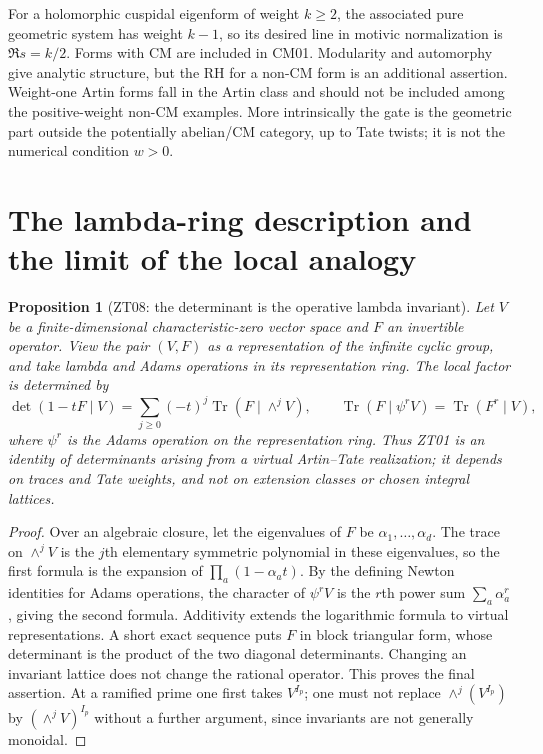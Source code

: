 \documentclass[11pt,a4paper]{article}
\newtheorem{proposition}[theorem]{Proposition}
\theoremstyle{definition}
\begin{document}
For a holomorphic cuspidal eigenform of weight $k\geq2$, the
associated pure geometric system has weight $k-1$, so its desired
line in motivic normalization is $\Re s=k/2$.  Forms with CM are
included in CM01.  Modularity and automorphy give analytic structure,
but the RH for a non-CM form is an additional assertion.  Weight-one
Artin forms fall in the Artin class and should not be included among
the positive-weight non-CM examples.  More intrinsically the gate
is the geometric part outside the potentially abelian/CM category,
up to Tate twists; it is not the numerical condition $w>0$.

\section{The lambda-ring description and the limit of the local analogy}
\label{sec:lambda}

\begin{proposition}[ZT08: the determinant is the operative lambda invariant]
\label{ZT08}
Let $V$ be a finite-dimensional characteristic-zero vector space and
$F$ an invertible operator.  View the pair $(V,F)$ as a representation
of the infinite cyclic group, and take lambda and Adams operations
in its representation ring.  The local factor is determined by
\[
 \det(1-tF\mid V)=\sum_{j\geq0}(-t)^j
                 \operatorname{Tr}(F\mid\wedge^jV),
 \qquad
 \operatorname{Tr}(F\mid\psi^r V)=\operatorname{Tr}(F^r\mid V),
\]
where $\psi^r$ is the Adams operation on the representation ring.
Thus ZT01 is an identity of determinants arising from a virtual
Artin--Tate realization; it depends on traces and Tate weights,
and not on extension classes or chosen integral lattices.
\end{proposition}

\begin{proof}
Over an algebraic closure, let the eigenvalues of $F$ be
$\alpha_1,\ldots,\alpha_d$.  The trace on $\wedge^jV$ is the
$j$th elementary symmetric polynomial in these eigenvalues, so
the first formula is the expansion of $\prod_a(1-\alpha_at)$.
By the defining Newton identities for Adams operations, the
character of $\psi^rV$ is the $r$th power sum $\sum_a\alpha_a^r$,
giving the second formula.  Additivity extends the logarithmic
formula to virtual representations.  A short exact sequence puts
$F$ in block triangular form, whose determinant is the product of
the two diagonal determinants.  Changing an invariant lattice
does not change the rational operator.  This proves the final
assertion.  At a ramified prime one first takes $V^{I_p}$; one
must not replace $\wedge^j(V^{I_p})$ by $(\wedge^jV)^{I_p}$
without a further argument, since invariants are not generally
monoidal.
\end{proof}
\end{document}
